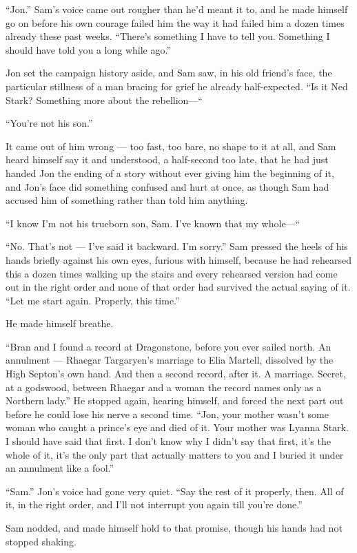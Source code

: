 “Jon.” Sam’s voice came out rougher than he’d meant it to, and he made himself go on before his own courage failed him the way it had failed him a dozen times already these past weeks. “There’s something I have to tell you. Something I should have told you a long while ago.”

Jon set the campaign history aside, and Sam saw, in his old friend’s face, the particular stillness of a man bracing for grief he already half-expected. “Is it Ned Stark? Something more about the rebellion—“

“You’re not his son.”

It came out of him wrong — too fast, too bare, no shape to it at all, and Sam heard himself say it and understood, a half-second too late, that he had just handed Jon the ending of a story without ever giving him the beginning of it, and Jon’s face did something confused and hurt at once, as though Sam had accused him of something rather than told him anything.

“I know I’m not his trueborn son, Sam. I’ve known that my whole—“

“No. That’s not — I’ve said it backward. I’m sorry.” Sam pressed the heels of his hands briefly against his own eyes, furious with himself, because he had rehearsed this a dozen times walking up the stairs and every rehearsed version had come out in the right order and none of that order had survived the actual saying of it. “Let me start again. Properly, this time.”

He made himself breathe.

“Bran and I found a record at Dragonstone, before you ever sailed north. An annulment — Rhaegar Targaryen’s marriage to Elia Martell, dissolved by the High Septon’s own hand. And then a second record, after it. A marriage. Secret, at a godswood, between Rhaegar and a woman the record names only as a Northern lady.” He stopped again, hearing himself, and forced the next part out before he could lose his nerve a second time. “Jon, your mother wasn’t some woman who caught a prince’s eye and died of it. Your mother was Lyanna Stark. I should have said that first. I don’t know why I didn’t say that first, it’s the whole of it, it’s the only part that actually matters to you and I buried it under an annulment like a fool.”

“Sam.” Jon’s voice had gone very quiet. “Say the rest of it properly, then. All of it, in the right order, and I’ll not interrupt you again till you’re done.”

Sam nodded, and made himself hold to that promise, though his hands had not stopped shaking.

